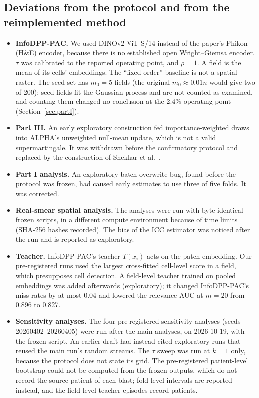 \documentclass[11pt]{article}
\theoremstyle{remark}
\theoremstyle{definition}
\begin{document}
\subsection{Deviations from the protocol and from the reimplemented method}\label{app:dev}
\begin{itemize}
\item \textbf{InfoDPP-PAC.} We used DINOv2 ViT-S/14 instead of the paper's Phikon (H\&E) encoder, because there is no established open Wright--Giemsa encoder. $\tau$ was calibrated to the reported operating point, and $\rho=1$. A field is the mean of its cells' embeddings. The ``fixed-order'' baseline is not a spatial raster. The seed set has $m_0=5$ fields (the original $m_0\approx0.01n$ would give two of 200); seed fields fit the Gaussian process and are not counted as examined, and counting them changed no conclusion at the 2.4\% operating point (Section~\ref{sec:partI}).
\item \textbf{Part III.} An early exploratory construction fed importance-weighted draws into ALPHA's unweighted null-mean update, which is not a valid supermartingale. It was withdrawn before the confirmatory protocol and replaced by the construction of Shekhar et al.\ \cite{shekhar2023rlfa}.
\item \textbf{Part I analysis.} An exploratory batch-overwrite bug, found before the protocol was frozen, had caused early estimates to use three of five folds. It was corrected.
\item \textbf{Real-smear spatial analysis.} The analyses were run with byte-identical frozen scripts, in a different compute environment because of time limits (SHA-256 hashes recorded). The bias of the ICC estimator was noticed after the run and is reported as exploratory.
\item \textbf{Teacher.} InfoDPP-PAC's teacher $T(x_i)$ acts on the patch embedding. Our pre-registered runs used the largest cross-fitted cell-level score in a field, which presupposes cell detection. A field-level teacher trained on pooled embeddings was added afterwards (exploratory); it changed InfoDPP-PAC's miss rates by at most 0.04 and lowered the relevance AUC at $m=20$ from 0.896 to 0.827.
\item \textbf{Sensitivity analyses.} The four pre-registered sensitivity analyses (seeds 20260402--20260405) were run after the main analyses, on 2026-10-19, with the frozen script. An earlier draft had instead cited exploratory runs that reused the main run's random streams. The $\tau$ sweep was run at $k=1$ only, because the protocol does not state its grid. The pre-registered patient-level bootstrap could not be computed from the frozen outputs, which do not record the source patient of each blast; fold-level intervals are reported instead, and the field-level-teacher episodes record patients.

\end{itemize}
\end{document}
